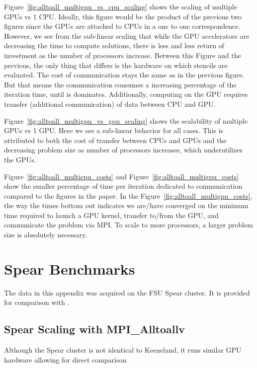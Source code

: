 Figure~\ref{fig:alltoall_multigpu_vs_cpu_scaling}  shows the scaling of multiple GPUs vs 1 CPU. Ideally, this figure would be the product of the previous two figures since the GPUs are attached to CPUs in a one to one correspondence. However, we see from the sub-linear scaling that while the GPU accelerators are decreasing the time to compute solutions, there is less and less return of investment as the number of processors increase. Between this Figure and the previous, the only thing that differs is the hardware on which stencils are evaluated. The cost of communication stays the same as in the previous figure. But that means the communication consumes a increasing percentage of the iteration time, until is dominates. 
Additionally, computing on the GPU requires transfer (additional communication) of data between CPU and GPU. 

Figure~\ref{fig:alltoall_multigpu_vs_gpu_scaling} shows the scalability of multiple GPUs vs 1 GPU. Here we see a sub-linear behavior for all cases. This is attributed to both the cost of transfer between CPUs and GPUs and the decreasing problem size as number of processors increases, which underutilizes the GPUs. 


Figure~\ref{fig:alltoall_multicpu_costs} and Figure~\ref{fig:alltoall_multigpu_costs} show the smaller percentage of time per iteration dedicated to communication compared to the figures in the paper. In the Figure~\ref{fig:alltoall_multigpu_costs}, the way the times bottom out indicates we are/have converged on the minimum time required to launch a GPU kernel, transfer to/from the GPU, and communicate the problem via MPI. To scale to more processors, a larger problem size is absolutely necessary.





\chapter{Spear Benchmarks} 
\label{app:spear_alltoallv_benchmarks}

The data in this appendix was acquired on the FSU Spear cluster. It is provided for comparison with \cite{BolligFlyerErlebacher2012}.

\section{Spear Scaling with MPI\_Alltoallv}

Although the Spear cluster is not identical to Keeneland, it runs similar GPU hardware allowing for direct comparison


